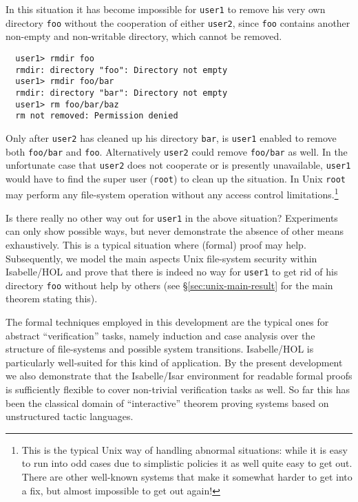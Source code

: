 \documentclass[11pt,a4paper]{article}
\newcommand{\secref}[1]{\S\ref{#1}}
\begin{document}
In this situation it has become impossible for \texttt{user1} to remove his
very own directory \texttt{foo} without the cooperation of either
\texttt{user2}, since \texttt{foo} contains another non-empty and non-writable
directory, which cannot be removed.

{\small
\begin{verbatim}
  user1> rmdir foo
  rmdir: directory "foo": Directory not empty
  user1> rmdir foo/bar
  rmdir: directory "bar": Directory not empty
  user1> rm foo/bar/baz
  rm not removed: Permission denied
\end{verbatim}
}

Only after \texttt{user2} has cleaned up his directory \texttt{bar}, is
\texttt{user1} enabled to remove both \texttt{foo/bar} and \texttt{foo}.
Alternatively \texttt{user2} could remove \texttt{foo/bar} as well.  In the
unfortunate case that \texttt{user2} does not cooperate or is presently
unavailable, \texttt{user1} would have to find the super user (\texttt{root})
to clean up the situation.  In Unix \texttt{root} may perform any file-system
operation without any access control limitations.\footnote{This is the typical
  Unix way of handling abnormal situations: while it is easy to run into odd
  cases due to simplistic policies it as well quite easy to get out.  There
  are other well-known systems that make it somewhat harder to get into a fix,
  but almost impossible to get out again!}

\bigskip Is there really no other way out for \texttt{user1} in the above
situation?  Experiments can only show possible ways, but never demonstrate the
absence of other means exhaustively.  This is a typical situation where
(formal) proof may help.  Subsequently, we model the main aspects Unix
file-system security within Isabelle/HOL \cite{Nipkow-et-al:2000:HOL} and
prove that there is indeed no way for \texttt{user1} to get rid of his
directory \texttt{foo} without help by others (see
\secref{sec:unix-main-result} for the main theorem stating this).

\medskip The formal techniques employed in this development are the typical
ones for abstract ``verification'' tasks, namely induction and case analysis
over the structure of file-systems and possible system transitions.
Isabelle/HOL \cite{Nipkow-et-al:2000:HOL} is particularly well-suited for this
kind of application.  By the present development we also demonstrate that the
Isabelle/Isar environment \cite{Wenzel:1999:TPHOL,Wenzel:2000:isar-ref} for
readable formal proofs is sufficiently flexible to cover non-trivial
verification tasks as well.  So far this has been the classical domain of
``interactive'' theorem proving systems based on unstructured tactic
languages.






\end{document}
